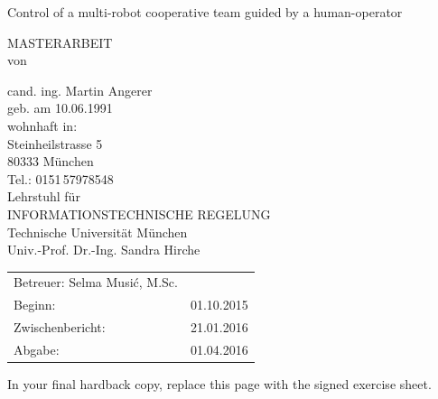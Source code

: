 \documentclass[a4paper,twoside, openright,12pt]{report}
\begin{document}
\pagestyle{empty}
\enlargethispage{4.5cm} %
\begin{center}
\phantom{u}
\vspace{0.5cm}
\Huge{\sc Control of a multi-robot cooperative team guided by a human-operator}\\
\vspace{1.5cm}
                                 \large{%
                                 \large{	MASTERARBEIT\\ 
										   von\\}          

						\vspace{0.4cm}
					cand. ing. Martin Angerer\\
						\vspace{0.5cm}
					geb. am 10.06.1991\\
					wohnhaft in:\\
					Steinheilstrasse 5\\
					80333 M\"unchen\\
					Tel.: 0151\,57978548\\
					\vspace{1.5cm}
					Lehrstuhl f\"ur\\
					INFORMATIONSTECHNISCHE REGELUNG \\
					Technische Universit\"at M\"unchen\\
					\vspace{0.6cm}
                    Univ.-Prof. Dr.-Ing. Sandra Hirche}
\end{center}
\vspace{5.0cm}
\begin{tabular}{ll}
Betreuer: Selma Musi\'c, M.Sc.  \\
Beginn: & 01.10.2015  \\
Zwischenbericht: &  21.01.2016  \\
Abgabe: &  01.04.2016 \\
\end{tabular}

\newpage
\cleardoublepage



\phantom{u}
\phantom{1}\vspace{6cm}
\begin{center}
In your final hardback copy, replace this page with the signed exercise sheet.
\end{center}
\end{document}
